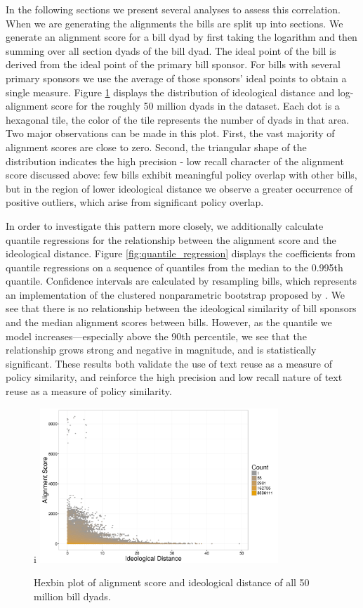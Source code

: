 \documentclass[12pt]{article} %
\begin{document}
In the following sections we present several analyses to assess this correlation. When we are generating the alignments the bills are split up into sections. We generate an alignment score for a bill dyad by first taking the logarithm and then summing over all section dyads of the bill dyad. The ideal point of the bill is derived from the ideal point of the primary bill sponsor. For bills with several primary sponsors we use the average of those sponsors' ideal points to obtain a single measure. Figure \ref{fig:ideology_plot} displays the distribution of ideological distance and log-alignment score for the roughly 50 million dyads in the dataset. Each dot is a hexagonal tile, the color of the tile represents the number of dyads in that area. Two major observations can be made in this plot. First, the vast majority of alignment scores are close to zero. Second, the triangular shape of the distribution indicates the high precision - low recall character of the alignment score discussed above: few bills exhibit meaningful policy overlap with other bills, but in the region of lower ideological distance we observe a greater occurrence of positive outliers, which arise from significant policy overlap. 

In order to investigate this pattern more closely, we additionally calculate
quantile regressions for the relationship between the alignment score and the
ideological distance. Figure \ref{fig:quantile_regression} displays the
coefficients from quantile regressions on a sequence of quantiles from the
median to the 0.995th quantile. Confidence intervals are calculated by resampling bills, which represents an implementation of the clustered nonparametric bootstrap proposed by \citet{harden2011bootstrap}. We see that there is no relationship between the ideological similarity of bill sponsors and the median alignment scores between bills. However, as the quantile we model increases---especially above the 90th percentile, we see that the relationship grows strong and negative in magnitude, and is statistically significant. These results both validate the use of text reuse as a measure of policy similarity, and reinforce the high precision and low recall nature of text reuse as a measure of policy similarity.


\begin{figure}[ht!]i
    \centering
    \includegraphics[width=0.8\textwidth]{figures/ideology_plot.png}
    \caption{Hexbin plot of alignment score and ideological distance of all 50 million bill dyads.}
    \label{fig:ideology_plot}
\end{figure}
\end{document}
